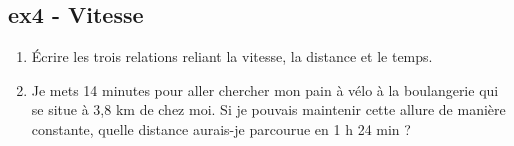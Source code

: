 \documentclass[12pt]{article}
\begin{document}
\subsection*{ex4 - Vitesse}

\begin{enumerate}
\item Écrire les trois relations reliant la vitesse, la distance et le temps.
\item Je mets 14 minutes pour aller chercher mon pain à vélo à la boulangerie qui se situe à 3,8 km de chez moi. Si je pouvais maintenir cette allure de
  manière constante, quelle distance aurais-je parcourue en 1 h 24 min ?
\end{enumerate}
\Pointilles[15]
\end{document}

